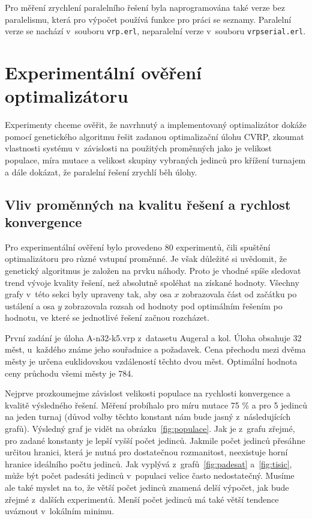 \documentclass[a4paper]{article}
\begin{document}
Pro měření zrychlení paralelního řešení byla naprogramována také verze bez paralelismu, která pro výpočet používá funkce pro práci se seznamy. Paralelní verze se nachází v~souboru {\tt vrp.erl}, neparalelní verze v~sou\-bo\-ru {\tt vrpserial.erl}.

\section{Experimentální ověření optimalizátoru}

Experimenty chceme ověřit, že navrhnutý a implementovaný optimalizátor do\-ká\-že pomocí genetického algoritmu řešit zadanou optimalizační úlohu CVRP, zkoumat vlastnosti systému v~závislosti na použitých proměnných jako je velikost populace, míra mutace a velikost skupiny vybraných jedinců pro křížení turnajem a dále dokázat, že paralelní řešení zrychlí běh úlohy.

\subsection{Vliv proměnných na kvalitu řešení a rychlost konvergence}

Pro experimentální ověření bylo provedeno 80 experimentů, čili spuštění optimalizátoru pro různé vstupní proměnné. Je však důležité si uvědomit, že genetický algoritmus je založen na prvku náhody. Proto je vhodné spíše sledovat trend vývoje kvality řešení, než absolutně spoléhat na získané hodnoty. Všechny grafy v~této sekci byly upraveny tak, aby osa $x$ zobrazovala část od začátku po ustálení a osa $y$ zobrazovala rozsah od hodnoty pod optimálním řešením po hodnotu, ve které se jednotlivé řešení začnou rozcházet.

První zadání je úloha A-n32-k5.vrp z~datasetu Augeral a kol. Úloha obsahuje 32 měst, u~každého známe jeho souřadnice a požadavek. Cena přechodu mezi dvěma městy je určena euklidovskou vzdáleností těchto dvou měst. Optimální hodnota ceny průchodu všemi městy je 784.

Nejprve prozkoumejme závislost velikosti populace na rychlosti konvergence a kvalitě výsledného řešení. Měření probíhalo pro míru mutace 75 \% a pro 5 jedinců na jeden turnaj (důvod volby těchto konstant nám bude jasný z~ná\-sle\-du\-jí\-cích grafů). Výsledný graf je vidět na obrázku~\ref{fig:populace}. Jak je z~grafu zřejmé, pro zadané konstanty je lepší vyšší počet jedinců. Jakmile počet jedinců přesáhne určitou hranici, která je nutná pro dostatečnou rozmanitost, neexistuje horní hranice ideálního počtu jedinců. Jak vyplývá z~grafů~\ref{fig:padesat} a~\ref{fig:tisic}, může být počet padesáti jedinců v~populaci velice často nedostatečný. Musíme ale také myslet na to, že větší počet jedinců znamená delší výpočet, jak bude zřejmé z~dalších experimentů. Menší počet jedinců má také větší tendence uváznout v~lokálním minimu.
\end{document}
